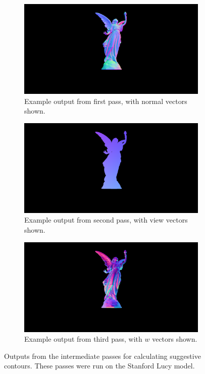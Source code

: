 \documentclass[10pt,twocolumn,letterpaper]{article}
\begin{document}
\begin{figure}
  \centering
  \begin{subfigure}{.88\linewidth}
    \includegraphics[width=1\linewidth]{lucy/normals.png}
    \caption{Example output from first pass, with normal vectors shown.}
    \label{fig:lucy-normals}
  \end{subfigure}
  \hfill
  \begin{subfigure}{.88\linewidth}
    \includegraphics[width=1\linewidth]{lucy/viewers.png}
    \caption{Example output from second pass, with view vectors shown.}
    \label{fig:lucy-views}
  \end{subfigure}
  \hfill
  \begin{subfigure}{0.88\linewidth}
    \includegraphics[width=1\linewidth]{lucy/ws.png}
    \caption{Example output from third pass, with $w$ vectors shown.}
    \label{fig:lucy-ws}
  \end{subfigure}
  \caption{Outputs from the intermediate passes for calculating suggestive contours. These passes were run on the Stanford Lucy model.}
  \label{fig:lucy-python}
\end{figure}
\end{document}
